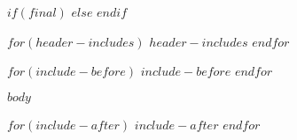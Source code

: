 
$if(final)$
\DraftOff
$else$
\DraftOn
$endif$

$for(header-includes)$
$header-includes$
$endfor$

\beforefulltext

$for(include-before)$
$include-before$
$endfor$

\begin{titlingpage}
\potentialdraftmark
\title{\titleinfo}
\author{\authorinfo}
\date{\yearinfo}
\maketitle
\thispagestyle{empty}
\makecopyright
\end{titlingpage}

$body$

$for(include-after)$
$include-after$
$endfor$
